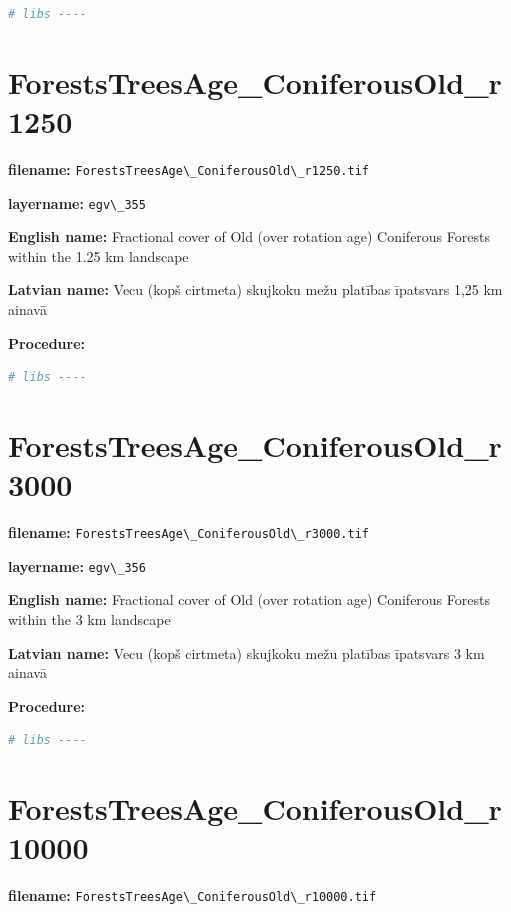 \documentclass[
]{book}
\newcommand{\passthrough}[1]{#1}
\begin{document}
\begin{lstlisting}[language=R]
# libs ----
\end{lstlisting}

\section{ForestsTreesAge\_ConiferousOld\_r1250}\label{ch06.355}

\textbf{filename:} \passthrough{\lstinline!ForestsTreesAge\_ConiferousOld\_r1250.tif!}

\textbf{layername:} \passthrough{\lstinline!egv\_355!}

\textbf{English name:} Fractional cover of Old (over rotation age) Coniferous Forests within the 1.25 km landscape

\textbf{Latvian name:} Vecu (kopš cirtmeta) skujkoku mežu platības īpatsvars 1,25 km ainavā

\textbf{Procedure:}

\begin{lstlisting}[language=R]
# libs ----
\end{lstlisting}

\section{ForestsTreesAge\_ConiferousOld\_r3000}\label{ch06.356}

\textbf{filename:} \passthrough{\lstinline!ForestsTreesAge\_ConiferousOld\_r3000.tif!}

\textbf{layername:} \passthrough{\lstinline!egv\_356!}

\textbf{English name:} Fractional cover of Old (over rotation age) Coniferous Forests within the 3 km landscape

\textbf{Latvian name:} Vecu (kopš cirtmeta) skujkoku mežu platības īpatsvars 3 km ainavā

\textbf{Procedure:}

\begin{lstlisting}[language=R]
# libs ----
\end{lstlisting}

\section{ForestsTreesAge\_ConiferousOld\_r10000}\label{ch06.357}

\textbf{filename:} \passthrough{\lstinline!ForestsTreesAge\_ConiferousOld\_r10000.tif!}
\end{document}
